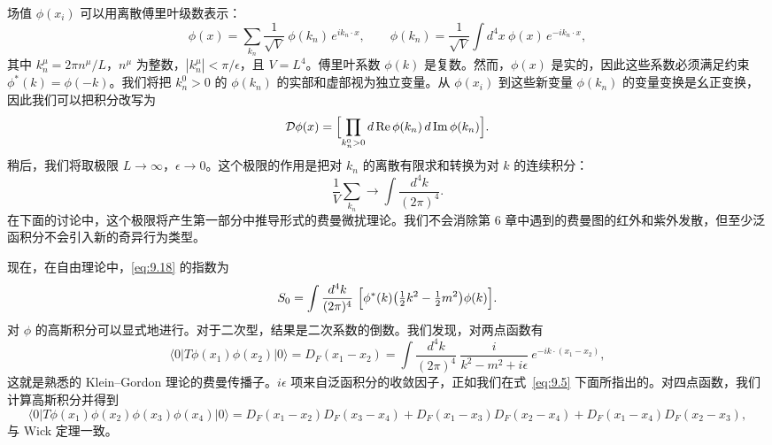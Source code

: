 场值 $\phi(x_i)$ 可以用离散傅里叶级数表示：
\begin{equation}
  \phi(x) = \sum_{k_n} \frac{1}{\sqrt{V}}\ \phi(k_n)\,e^{ik_n\cdot x},
  \qquad \phi(k_n) = \frac{1}{\sqrt{V}}\int d^4x\ \phi(x)\,e^{-ik_n\cdot x},
\end{equation}
其中 $k_n^\mu = 2\pi n^\mu/L$，$n^\mu$ 为整数，$|k_n^\mu| < \pi/\epsilon$，且 $V = L^4$。傅里叶系数 $\phi(k)$ 是复数。然而，$\phi(x)$ 是实的，因此这些系数必须满足约束 $\phi^{*}(k) = \phi(-k)$。我们将把 $k_n^0 > 0$ 的 $\phi(k_n)$ 的实部和虚部视为独立变量。从 $\phi(x_i)$ 到这些新变量 $\phi(k_n)$ 的变量变换是幺正变换，因此我们可以把积分改写为
\begin{equation}
  \mathcal{D}\phi(x) = \Bigl[ \prod_{k_n^0>0} d\,\mathrm{Re}\,\phi(k_n)\,
    d\,\mathrm{Im}\,\phi(k_n) \Bigr] .
\end{equation}
稍后，我们将取极限 $L\to\infty$，$\epsilon\to 0$。这个极限的作用是把对 $k_n$ 的离散有限求和转换为对 $k$ 的连续积分：
\begin{equation}
  \frac{1}{V}\sum_{k_n} \to \int \frac{d^4k}{(2\pi)^4} .
  \label{eq:9.22}
\end{equation}
在下面的讨论中，这个极限将产生第一部分中推导形式的费曼微扰理论。我们不会消除第 6 章中遇到的费曼图的红外和紫外发散，但至少泛函积分不会引入新的奇异行为类型。

现在，在自由理论中，\eqref{eq:9.18} 的指数为
\begin{equation}
  S_0 = \int \frac{d^4k}{(2\pi)^4}\ \Bigl[ \phi^{*}(k)
    \bigl( \tfrac{1}{2}k^2 - \tfrac{1}{2}m^2 \bigr)\phi(k) \Bigr] .
\end{equation}
对 $\phi$ 的高斯积分可以显式地进行。对于二次型，结果是二次系数的倒数。我们发现，对两点函数有
\begin{equation}
  \langle 0|T\phi(x_1)\phi(x_2)|0\rangle = D_F(x_1-x_2)
  = \int \frac{d^4k}{(2\pi)^4}\ \frac{i}{k^2-m^2+i\epsilon}\
    e^{-ik\cdot(x_1-x_2)} ,
  \label{eq:9.28}
\end{equation}
这就是熟悉的 Klein--Gordon 理论的费曼传播子。$i\epsilon$ 项来自泛函积分的收敛因子，正如我们在式~\eqref{eq:9.5} 下面所指出的。对四点函数，我们计算高斯积分并得到
\begin{equation}
  \langle 0|T\phi(x_1)\phi(x_2)\phi(x_3)\phi(x_4)|0\rangle
  = D_F(x_1-x_2)D_F(x_3-x_4)
    + D_F(x_1-x_3)D_F(x_2-x_4)
    + D_F(x_1-x_4)D_F(x_2-x_3) ,
  \label{eq:9.29}
\end{equation}
与 Wick 定理一致。

